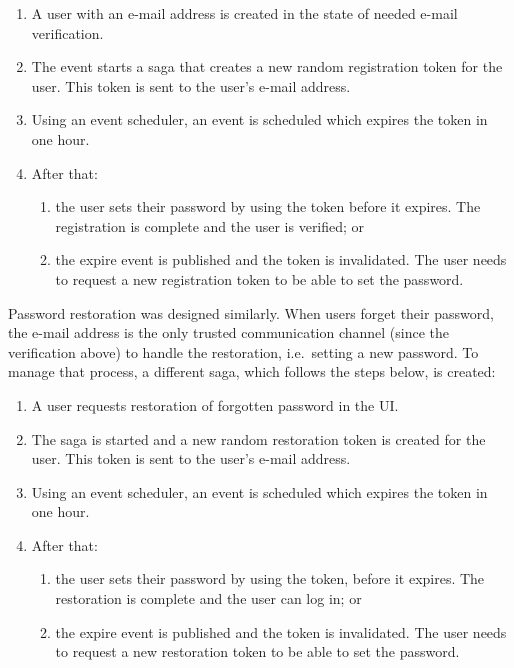 \documentclass{book}
\begin{document}
\begin{enumerate}
\def\labelenumi{\arabic{enumi}.}
\tightlist
\item
  A user with an e-mail address is created in the state of needed e-mail
  verification.
\item
  The event starts a saga that creates a new random registration token
  for the user. This token is sent to the user's e-mail address.
\item
  Using an event scheduler, an event is scheduled which expires the
  token in one hour.
\item
  After that:

  \begin{enumerate}
  \def\labelenumii{\alph{enumii})}
  \tightlist
  \item
    the user sets their password by using the token before it expires.
    The registration is complete and the user is verified; or
  \item
    the expire event is published and the token is invalidated. The user
    needs to request a new registration token to be able to set the
    password.
  \end{enumerate}
\end{enumerate}

Password restoration was designed similarly. When users forget their
password, the e-mail address is the only trusted communication channel
(since the verification above) to handle the restoration, i.e.~setting a
new password. To manage that process, a different saga, which follows
the steps below, is created:

\begin{enumerate}
\def\labelenumi{\arabic{enumi}.}
\tightlist
\item
  A user requests restoration of forgotten password in the UI.
\item
  The saga is started and a new random restoration token is created for
  the user. This token is sent to the user's e-mail address.
\item
  Using an event scheduler, an event is scheduled which expires the
  token in one hour.
\item
  After that:

  \begin{enumerate}
  \def\labelenumii{\alph{enumii})}
  \tightlist
  \item
    the user sets their password by using the token, before it expires.
    The restoration is complete and the user can log in; or
  \item
    the expire event is published and the token is invalidated. The user
    needs to request a new restoration token to be able to set the
    password.
  \end{enumerate}
\end{enumerate}
\end{document}
